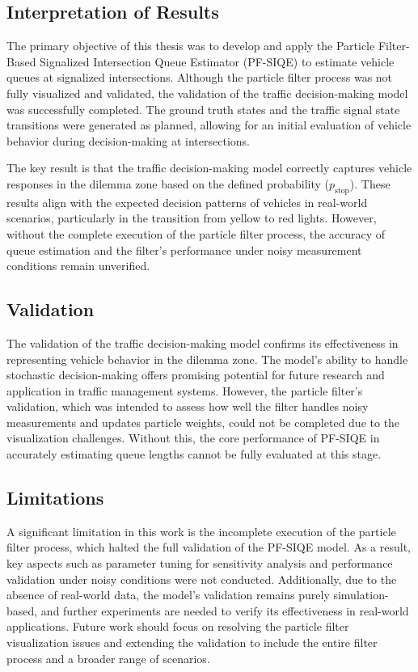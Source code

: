 \subsection{Interpretation of Results}
The primary objective of this thesis was to develop and apply the Particle Filter-Based Signalized Intersection Queue Estimator (PF-SIQE) to estimate vehicle queues at signalized intersections. Although the particle filter process was not fully visualized and validated, the validation of the traffic decision-making model was successfully completed. The ground truth states and the traffic signal state transitions were generated as planned, allowing for an initial evaluation of vehicle behavior during decision-making at intersections.

The key result is that the traffic decision-making model correctly captures vehicle responses in the dilemma zone based on the defined probability ($p_\text{stop}$). These results align with the expected decision patterns of vehicles in real-world scenarios, particularly in the transition from yellow to red lights. However, without the complete execution of the particle filter process, the accuracy of queue estimation and the filter's performance under noisy measurement conditions remain unverified.

\subsection{Validation}
The validation of the traffic decision-making model confirms its effectiveness in representing vehicle behavior in the dilemma zone. The model’s ability to handle stochastic decision-making offers promising potential for future research and application in traffic management systems. However, the particle filter’s validation, which was intended to assess how well the filter handles noisy measurements and updates particle weights, could not be completed due to the visualization challenges. Without this, the core performance of PF-SIQE in accurately estimating queue lengths cannot be fully evaluated at this stage.

\subsection{Limitations}
A significant limitation in this work is the incomplete execution of the particle filter process, which halted the full validation of the PF-SIQE model. As a result, key aspects such as parameter tuning for sensitivity analysis and performance validation under noisy conditions were not conducted. Additionally, due to the absence of real-world data, the model’s validation remains purely simulation-based, and further experiments are needed to verify its effectiveness in real-world applications. Future work should focus on resolving the particle filter visualization issues and extending the validation to include the entire filter process and a broader range of scenarios.

